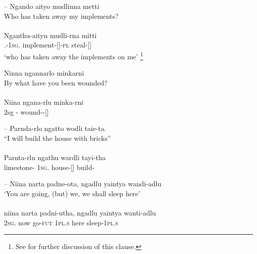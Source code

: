 \documentclass{langscibook}
\begin{document}
\begin{xlist}
       	

       	
--
\ea\label{ex:5:13}
Ngando    aityo  		 mudlinna                       metti \\
Who has taken away my implements? \\
\citep[10]{teichelmann_outlines_1840} \\
\gll  Nganthu-aityu  		 mudli-rna  	          mitti \\
.-1\textsc{sg}.  	 implement-[]-\textsc{pl}    steal-[]	                         \\
\glt `who has taken away the implements on me' \footnote{See  for further discussion of this clause. }
\z

\ea\label{ex:5:14}
Ninna 	ngannarlo 	minkarni \\
By what have you been wounded? \\
\citep[10]{teichelmann_outlines_1840} \\
\gll Niina	 ngana-rlu            minka-rni	 \\
2sg        - 	wound--[]                                \\
\z

      	       


--
\ea\label{ex:5:15}
Parnda-rlo 		ngatto 	  wodli                 taie-ta.  \\
“I will build the house with bricks” \\   	        
\citep[24]{teichelmann_outlines_1840} \\
\gll Parnta-rlu  		 ngathu     wardli              tayi-tha \\
limestone-   	1\textsc{sg}.   house-[]   build-                               \\
\z
      	         

      	         

--
\ea\label{ex:5:16}
Niina	   narta     padne-ota,    ngadlu   yaintya   wandi-adlu \\
\glt `You are going, (but) we, we shall sleep here' \\
\citep[23]{teichelmann_outlines_1840} \\
\gll niina          narta    padni-utha,   ngadlu    yaintya   wanti-adlu \\
2\textsc{sg}.    now     go-\textsc{fut}           1\textsc{pl}.\textsc{s}        here        sleep-1\textsc{pl}.\textsc{s} \\
\z





\end{xlist}
\end{document}
